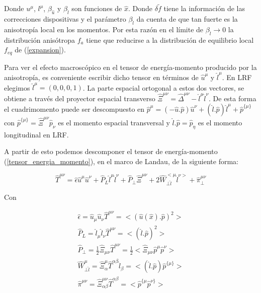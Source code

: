 \documentclass[11pt,a4paper]{article}
\begin{document}
Donde $u^{\mu}$, $l^{\mu}$, $\beta_{\hat{u}}$ y $\beta_{\hat{l}}$ son funciones de $\hat{x}$. Donde ${\delta}\widetilde{f}$ tiene la información de las correcciones dispositivas y el parámetro $\beta_{\hat{l}}$ da cuenta de que tan fuerte es la anisotropía local en los momentos. Por esta razón en el límite de $\beta_{\hat{l}}\rightarrow{0}$ la distribución anisótropa $f_{a}$ tiene que reducirse a la distribución de equilibrio local $f_{eq}$ de (\ref{expansion}).

Para ver el efecto macroscópico en el tensor de energía-momento producido por la anisotropía, es conveniente escribir dicho tensor en términos de $\hat{u}^{\mu}$
 y $\hat{l}^{\mu}$. En LRF elegimos $\hat{l}^{\mu}=(0,0,0,1)$.
 La parte espacial ortogonal a estos dos vectores, se obtiene a través del proyector espacial transverso $\hat{\Xi}^{{\mu}{\nu}}=\hat{\Delta}^{{\mu}{\nu}}-\hat{l}^{\mu}\hat{l}^{\nu}$. De esta forma el cuadrimomento puede ser descompuesto en $\hat{p}^{\mu}=(-\hat{u}.\hat{p})\hat{u}^{\nu}+(\hat{l}.\hat{p})\hat{l}^{\mu}+\hat{p}^{{\{\mu}\}}$ con $\hat{p}^{{\{\mu}\}}=\hat{\Xi}^{{\mu}{\nu}}\hat{p}_{\nu}$ es el momento espacial transversal y $\hat{l}.\hat{p}=\hat{p}_{\eta}$ es el momento longitudinal en LRF.
 
 A partir de esto podemos descomponer el tensor de energía-momento (\ref{tensor_energia_momento}), en el marco de Landau, de la siguiente forma:
 
 \begin{equation}
\hat{T}^{{\mu}{\nu}}= 
\hat{\epsilon}\hat{u}^{\mu}\hat{u}^{\nu}
+\hat{P}_{L}\hat{l}^{\mu}\hat{l}^{\nu}
+\hat{P}_{\bot}\hat{\Xi}^{{\mu}{\nu}}
+2\hat{W}_{{\bot}{\hat{l}}}^{<{\mu}}{{\hat{l}^{\nu>}}}
+\hat{\pi}^{{\mu}{\nu}}_{\bot}
\label{tensor_energia_momento_anisotropo}
 \end{equation}

Con 

\begin{subequations}
\begin{align}
\hat{\epsilon}=\hat{u}_{\mu}\hat{u}_{\nu}\hat{T}^{{\mu}{\nu}}=<(\hat{u}(\hat{x}).\hat{p})^2>\\
\label{presion_longitudinal}
\hat{P}_{L}=
\hat{l}_{\mu}\hat{l}_{\nu}\hat{T}^{{\mu}{\nu}}= 
<(\hat{l}.\hat{p})^2>\\
\label{presion_transversal}
\hat{P}_{\bot}=
\frac{1}{2}\hat{\Xi}_{{\mu}{\nu}}\hat{T}^{{\mu}{\nu}}=
\frac{1}{2}<\hat{\Xi}_{{\mu}{\nu}}\hat{p}^{\mu}\hat{p}^{\nu}>\\
\hat{W}_{{\bot}{\hat{l}}}^{{\mu}}=
\hat{\Xi}^{\mu}_{\alpha}\hat{T}^{{\alpha}{\beta}}\hat{l}_{\beta}=
<(\hat{l}.\hat{p})\hat{p}^{{\{\mu}\}}>\\
\label{shear_transversal}
\hat{\pi}^{{\mu}{\nu}}= \hat{\Xi}^{{\mu}{\nu}}_{{\alpha}{\beta}}\hat{T}^{{\alpha}{\beta}}=<\hat{p}^{{\{}\mu}\hat{p}^{\nu{\}}}>
\end{align}
\end{subequations}
\end{document}
